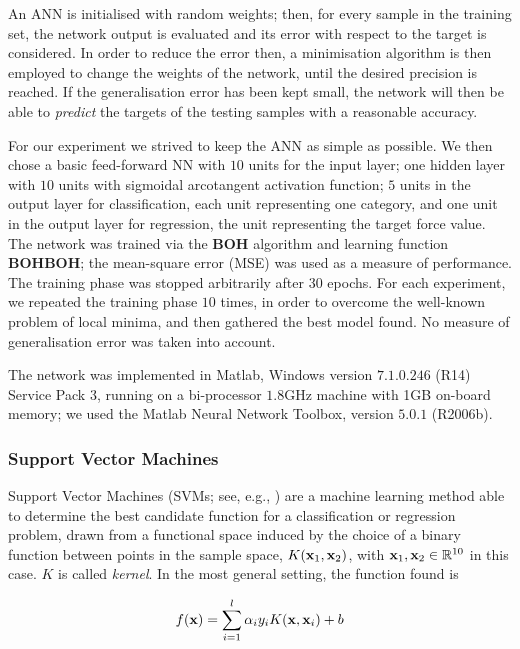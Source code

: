 An ANN is initialised with random weights; then, for every sample in
the training set, the network output is evaluated and its error with
respect to the target is considered. In order to reduce the error
then, a minimisation algorithm is then employed to change the weights
of the network, until the desired precision is reached. If the
generalisation error has been kept small, the network will then be
able to \emph{predict} the targets of the testing samples with a
reasonable accuracy.

For our experiment we strived to keep the ANN as simple as possible.
We then chose a basic feed-forward NN with $10$ units for the input
layer; one hidden layer with $10$ units with sigmoidal arcotangent
activation function; $5$ units in the output layer for classification,
each unit representing one category, and one unit in the output layer
for regression, the unit representing the target force value. The
network was trained via the \textbf{BOH} algorithm and learning
function \textbf{BOHBOH}; the mean-square error (MSE) was used as a
measure of performance. The training phase was stopped arbitrarily
after $30$ epochs. For each experiment, we repeated the training phase
$10$ times, in order to overcome the well-known problem of local
minima, and then gathered the best model found. No measure of
generalisation error was taken into account.

The network was implemented in Matlab, Windows version $7.1.0.246$
(R14) Service Pack 3, running on a bi-processor $1.8$GHz machine with
1GB on-board memory; we used the Matlab Neural Network Toolbox,
version $5.0.1$ (R2006b).

\subsubsection{Support Vector Machines}

Support Vector Machines (SVMs; see, e.g.,
\cite{BGV92,Burges98,Cristianini00}) are a machine learning method
able to determine the best candidate function for a classification or
regression problem, drawn from a functional space induced by the
choice of a binary function between points in the sample space,
$K(\mathbf{x}_1,\mathbf{x}_2)$, with $\mathbf{x}_1, \mathbf{x}_2 \in \mathbb{R}^{10}$ in this case. $K$
is called \emph{kernel}. In the most general setting, the function
found is

\begin{equation} \label{eqn:sol}
  f(\xx) = \sum_{i=1}^l \alpha_i y_i K(\xx,\xx_i) + b
\end{equation}

